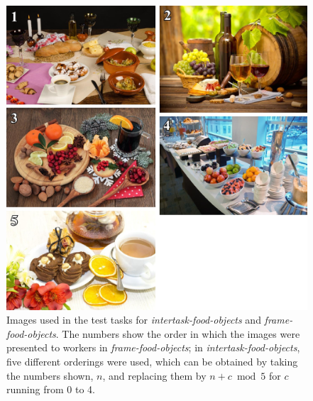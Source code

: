\documentclass{sigchi}
\begin{document}
\begin{figure}
	\begin{center}
	\includegraphics{figs/task1-test.jpg}
	\end{center}
	\caption{
		Images used in the test tasks for \textit{intertask-food-objects}
		and \textit{frame-food-objects}.  
		The numbers show the order in which the 
		images were presented to workers in \textit{frame-food-objects};
		in \textit{intertask-food-objects}, five different orderings were
		used, which can be obtained by taking the numbers shown, $n$,
		and replacing them by $n + c \bmod 5$ for $c$ running from 0 to 4.
	}
	\label{fig:task1:test}
\end{figure}
\end{document}
